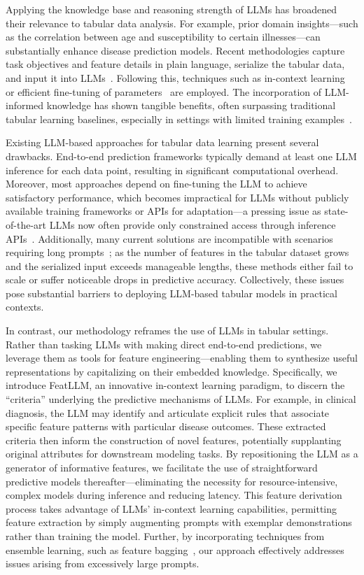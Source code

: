 Applying the knowledge base and reasoning strength of LLMs has broadened their relevance to tabular data analysis. For example, prior domain insights—such as the correlation between age and susceptibility to certain illnesses—can substantially enhance disease prediction models. Recent methodologies capture task objectives and feature details in plain language, serialize the tabular data, and input it into LLMs~\cite{dinh2022lift,wang2023anypredict}. Following this, techniques such as in-context learning~\cite{nam2023semi} or efficient fine-tuning of parameters~\cite{dinh2022lift,hegselmann2023tabllm} are employed. The incorporation of LLM-informed knowledge has shown tangible benefits, often surpassing traditional tabular learning baselines, especially in settings with limited training examples~\cite{hegselmann2023tabllm}.

Existing LLM-based approaches for tabular data learning present several drawbacks. End-to-end prediction frameworks typically demand at least one LLM inference for each data point, resulting in significant computational overhead. Moreover, most approaches depend on fine-tuning the LLM to achieve satisfactory performance, which becomes impractical for LLMs without publicly available training frameworks or APIs for adaptation—a pressing issue as state-of-the-art LLMs now often provide only constrained access through inference APIs~\cite{anil2023palm,openai2023gpt4}. Additionally, many current solutions are incompatible with scenarios requiring long prompts~\cite{liu2023lost}; as the number of features in the tabular dataset grows and the serialized input exceeds manageable lengths, these methods either fail to scale or suffer noticeable drops in predictive accuracy. Collectively, these issues pose substantial barriers to deploying LLM-based tabular models in practical contexts.

In contrast, our methodology reframes the use of LLMs in tabular settings. Rather than tasking LLMs with making direct end-to-end predictions, we leverage them as tools for feature engineering—enabling them to synthesize useful representations by capitalizing on their embedded knowledge. Specifically, we introduce \textsf{FeatLLM}, an innovative in-context learning paradigm, to discern the “criteria” underlying the predictive mechanisms of LLMs. For example, in clinical diagnosis, the LLM may identify and articulate explicit rules that associate specific feature patterns with particular disease outcomes. These extracted criteria then inform the construction of novel features, potentially supplanting original attributes for downstream modeling tasks. By repositioning the LLM as a generator of informative features, we facilitate the use of straightforward predictive models thereafter—eliminating the necessity for resource-intensive, complex models during inference and reducing latency. This feature derivation process takes advantage of LLMs’ in-context learning capabilities, permitting feature extraction by simply augmenting prompts with exemplar demonstrations rather than training the model. Further, by incorporating techniques from ensemble learning, such as feature bagging~\cite{breiman2001random}, our approach effectively addresses issues arising from excessively large prompts.

